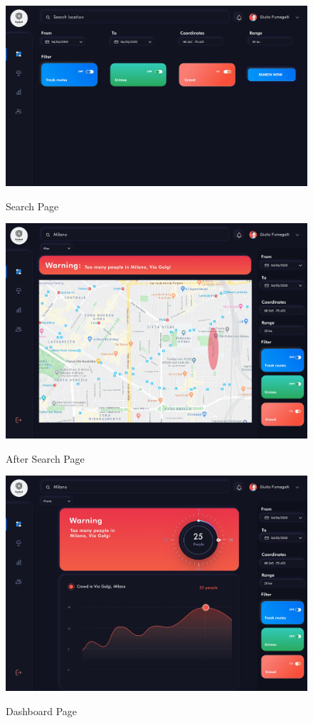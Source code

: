 \documentclass[../main.tex]{subfiles}
\begin{document}
    \begin{figure}[H]
        \centering
        \includegraphics[scale = 0.6]{assets/mockups/mock_search.png}\\
        \caption[]{Search Page}\label{fig:figure}
    \end{figure}
    \begin{figure}[H]
        \centering
        \includegraphics[scale = 0.6]{assets/mockups/mock_aftersearch.png}\\
        \caption[]{After Search Page}\label{fig:figure2}
    \end{figure}
    \newpage
    \begin{figure}[H]
        \centering
        \includegraphics[scale = 0.6]{assets/mockups/mock_dash.png}\\
        \caption[]{Dashboard Page}\label{fig:figure3}
    \end{figure}
\end{document}
